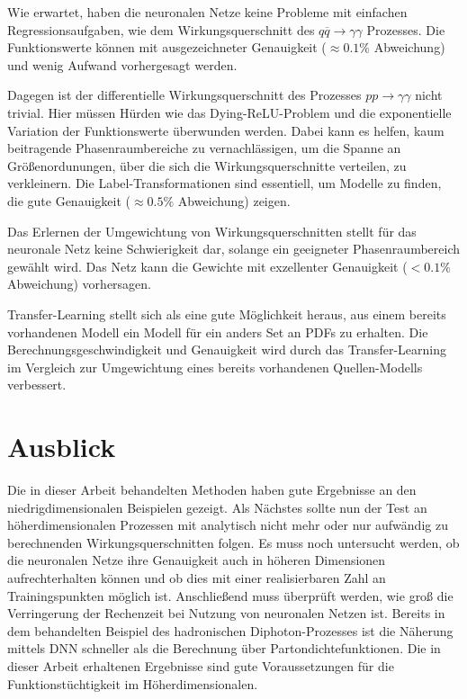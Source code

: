 Wie erwartet, haben die neuronalen Netze keine Probleme mit einfachen Regressionsaufgaben, wie dem Wirkungsquerschnitt des $q\overline{q} \rightarrow \gamma \gamma$ Prozesses. Die Funktionswerte können mit ausgezeichneter Genauigkeit ($\approx 0.1\%$ Abweichung) und wenig Aufwand vorhergesagt werden.

Dagegen ist der differentielle Wirkungsquerschnitt des Prozesses $pp \rightarrow \gamma \gamma$ nicht trivial. Hier müssen Hürden wie das Dying-ReLU-Problem und die exponentielle Variation der Funktionswerte überwunden werden. Dabei kann es helfen, kaum beitragende Phasenraumbereiche zu vernachlässigen, um die Spanne an Größenordunungen, über die sich die Wirkungsquerschnitte verteilen, zu verkleinern. Die Label-Transformationen sind essentiell, um Modelle zu finden, die gute Genauigkeit ($\approx 0.5\%$ Abweichung) zeigen.

Das Erlernen der Umgewichtung von Wirkungsquerschnitten stellt für das neuronale Netz keine Schwierigkeit dar, solange ein geeigneter Phasenraumbereich gewählt wird. Das Netz kann die Gewichte mit exzellenter Genauigkeit ($<0.1\%$ Abweichung) vorhersagen.

Transfer-Learning stellt sich als eine gute Möglichkeit heraus, aus einem bereits vorhandenen Modell ein Modell für ein anders Set an PDFs zu erhalten. Die Berechnungsgeschwindigkeit und Genauigkeit wird durch das Transfer-Learning im Vergleich zur Umgewichtung eines bereits vorhandenen Quellen-Modells verbessert.

\section{Ausblick}
Die in dieser Arbeit behandelten Methoden haben gute Ergebnisse an den niedrigdimensionalen Beispielen gezeigt. Als Nächstes sollte nun der Test an höherdimensionalen Prozessen mit analytisch nicht mehr oder nur aufwändig zu berechnenden Wirkungsquerschnitten folgen. Es muss noch untersucht werden, ob die neuronalen Netze ihre Genauigkeit auch in höheren Dimensionen aufrechterhalten können und ob dies mit einer realisierbaren Zahl an Trainingspunkten möglich ist. Anschließend muss überprüft werden, wie groß die Verringerung der Rechenzeit bei Nutzung von neuronalen Netzen ist. Bereits in dem behandelten Beispiel des hadronischen Diphoton-Prozesses ist die Näherung mittels DNN schneller als die Berechnung über Partondichtefunktionen. Die in dieser Arbeit erhaltenen Ergebnisse sind gute Voraussetzungen für die Funktionstüchtigkeit im Höherdimensionalen.

